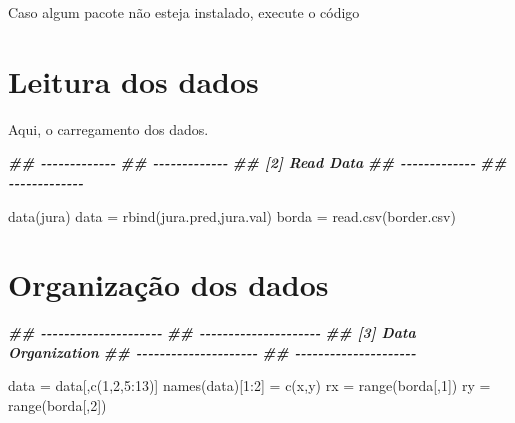 \documentclass[
]{book}
\newenvironment{Shaded}{\begin{snugshade}}{\end{snugshade}}
\newcommand{\DecValTok}[1]{\textcolor[rgb]{0.00,0.00,0.81}{#1}}
\newcommand{\DocumentationTok}[1]{\textcolor[rgb]{0.56,0.35,0.01}{\textbf{\textit{#1}}}}
\newcommand{\FunctionTok}[1]{\textcolor[rgb]{0.00,0.00,0.00}{#1}}
\newcommand{\NormalTok}[1]{#1}
\newcommand{\OtherTok}[1]{\textcolor[rgb]{0.56,0.35,0.01}{#1}}
\newcommand{\SpecialCharTok}[1]{\textcolor[rgb]{0.00,0.00,0.00}{#1}}
\newcommand{\StringTok}[1]{\textcolor[rgb]{0.31,0.60,0.02}{#1}}
\theoremstyle{definition}
\theoremstyle{definition}
\theoremstyle{definition}
\theoremstyle{definition}
\theoremstyle{remark}
\begin{document}
Caso algum pacote não esteja instalado, execute o código

\hypertarget{leitura-dos-dados}{%
\section{Leitura dos dados}\label{leitura-dos-dados}}

Aqui, o carregamento dos dados.

\begin{Shaded}
\begin{Highlighting}[]
\DocumentationTok{\#\# {-}{-}{-}{-}{-}{-}{-}{-}{-}{-}{-}{-}{-}}
\DocumentationTok{\#\# {-}{-}{-}{-}{-}{-}{-}{-}{-}{-}{-}{-}{-}}
\DocumentationTok{\#\# [2] Read Data}
\DocumentationTok{\#\# {-}{-}{-}{-}{-}{-}{-}{-}{-}{-}{-}{-}{-}}
\DocumentationTok{\#\# {-}{-}{-}{-}{-}{-}{-}{-}{-}{-}{-}{-}{-}}

\FunctionTok{data}\NormalTok{(jura)}
\NormalTok{data }\OtherTok{=} \FunctionTok{rbind}\NormalTok{(jura.pred,jura.val)}
\NormalTok{borda }\OtherTok{=} \FunctionTok{read.csv}\NormalTok{(}\StringTok{\textquotesingle{}border.csv\textquotesingle{}}\NormalTok{)}
\end{Highlighting}
\end{Shaded}

\hypertarget{organizauxe7uxe3o-dos-dados}{%
\section{Organização dos dados}\label{organizauxe7uxe3o-dos-dados}}

\begin{Shaded}
\begin{Highlighting}[]
\DocumentationTok{\#\# {-}{-}{-}{-}{-}{-}{-}{-}{-}{-}{-}{-}{-}{-}{-}{-}{-}{-}{-}{-}{-}}
\DocumentationTok{\#\# {-}{-}{-}{-}{-}{-}{-}{-}{-}{-}{-}{-}{-}{-}{-}{-}{-}{-}{-}{-}{-}}
\DocumentationTok{\#\# [3] Data Organization}
\DocumentationTok{\#\# {-}{-}{-}{-}{-}{-}{-}{-}{-}{-}{-}{-}{-}{-}{-}{-}{-}{-}{-}{-}{-}}
\DocumentationTok{\#\# {-}{-}{-}{-}{-}{-}{-}{-}{-}{-}{-}{-}{-}{-}{-}{-}{-}{-}{-}{-}{-}}

\NormalTok{data }\OtherTok{=}\NormalTok{ data[,}\FunctionTok{c}\NormalTok{(}\DecValTok{1}\NormalTok{,}\DecValTok{2}\NormalTok{,}\DecValTok{5}\SpecialCharTok{:}\DecValTok{13}\NormalTok{)]}
\FunctionTok{names}\NormalTok{(data)[}\DecValTok{1}\SpecialCharTok{:}\DecValTok{2}\NormalTok{] }\OtherTok{=} \FunctionTok{c}\NormalTok{(}\StringTok{\textquotesingle{}x\textquotesingle{}}\NormalTok{,}\StringTok{\textquotesingle{}y\textquotesingle{}}\NormalTok{)}
\NormalTok{rx }\OtherTok{=} \FunctionTok{range}\NormalTok{(borda[,}\DecValTok{1}\NormalTok{])}
\NormalTok{ry }\OtherTok{=} \FunctionTok{range}\NormalTok{(borda[,}\DecValTok{2}\NormalTok{])}
\end{Highlighting}
\end{Shaded}
\end{document}

